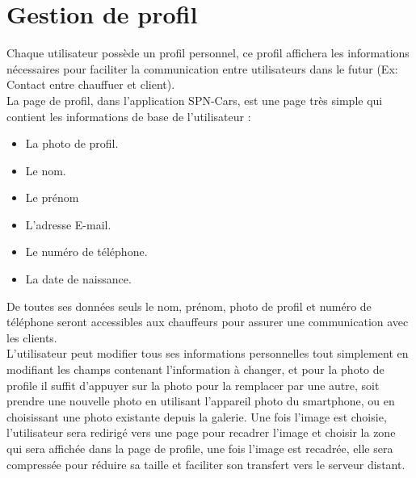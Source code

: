 \section{Gestion de profil}
Chaque utilisateur possède un profil personnel, ce profil affichera les informations nécessaires pour faciliter la communication entre utilisateurs dans le futur (Ex: Contact entre chauffuer et client).\\
\noindent La page de profil, dans l'application SPN-Cars, est une page très simple qui contient les informations de base de l'utilisateur :
\begin{itemize}
    \item La photo de profil.
    \item Le nom.
    \item Le prénom
    \item L'adresse E-mail.
    \item Le numéro de téléphone.
    \item La date de naissance.
\end{itemize}
De toutes ses données seuls le nom, prénom, photo de profil et numéro de téléphone seront accessibles aux chauffeurs pour assurer une communication avec les clients.\\
\noindent L'utilisateur peut modifier tous ses informations personnelles tout simplement en modifiant les champs contenant l'information à changer, et pour la photo de profile il suffit d'appuyer sur la photo pour la remplacer par une autre, soit prendre une nouvelle photo en utilisant l'appareil photo du smartphone, ou en choisissant une photo existante depuis la galerie. Une fois l'image est choisie, l'utilisateur sera redirigé vers une page pour recadrer l'image et choisir la zone qui sera affichée dans la page de profile, une fois l'image est recadrée, elle sera compressée pour réduire sa taille et faciliter son transfert vers le serveur distant.
